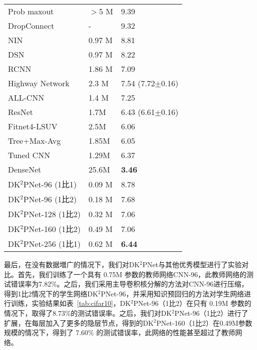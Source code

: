 \begin{table} [!h]
\begin{center}
\begin{tabular}{L{5cm}C{2cm}C{3cm}}
Prob maxout~\cite{springenberg2013improving} & $>$5 M & 9.39 \\
DropConnect~\cite{wan2013regularization} & - & 9.32 \\
NIN~\cite{lin2013network} & 0.97 M & 8.81 \\
DSN~\cite{lee2015deeply} & 0.97 M & 8.22 \\
RCNN~\cite{liang2015recurrent} & 1.86 M & 7.09 \\
Highway Network~\cite{srivastava2015training} & 2.3 M & 7.54 (7.72${\pm}$0.16) \\
ALL-CNN~\cite{springenberg2014striving} & 1.4 M & 7.25 \\
ResNet~\cite{he2015deep} & 1.7M & {6.43 (6.61${\pm}$0.16)} \\
Fitnet4-LSUV~\cite{mishkin2015all} & 2.5M & 6.06 \\
Tree+Max-Avg~\cite{lee2015generalizing} & 1.85M & 6.05 \\
Tuned CNN~\cite{snoek2015scalable} & 1.29M & 6.37 \\
DenseNet~\cite{huang2016densely} & 25.6M & \bf{3.46} \\
\hline
DK$^2$PNet-96 (1比1) & 0.09 M & {8.78} \\
DK$^2$PNet-96 (1比2) & 0.18 M &{7.68} \\
DK$^2$PNet-128 (1比2) & 0.32 M & 7.06 \\
DK$^2$PNet-160 (1比2) & 0.49 M & 7.06 \\
DK$^2$PNet-256 (1比1) & 0.62 M & \bf{6.44} \\
  \bottomrule[1.5pt]
\end{tabular}
\end{center}
\end{table}

最后，在没有数据増广的情况下，我们对DK$^2$PNet与其他优秀模型进行了实验对比。首先，我们训练了一个具有 0.75M 参数的教师网络CNN-96，此教师网络的测试错误率为7.82\%。之后，我们采用主导卷积核分解的方法对CNN-96进行压缩，得到1比2情况下的学生网络DK$^2$PNet-96，并采用知识预回归的方法对学生网络进行训练，实验结果如表~\ref{tab:cifar10}，DK$^2$PNet-96（1比2）在只有 0.19M 参数的情况下，取得了8.73\%的测试错误率。之后，我们对DK$^2$PNet-96（1比2）进行了扩展，在每层加入了更多的隐层节点，得到的DK$^2$PNet-160（1比2）在0.49M参数规模的情况下，得到了 7.60\% 的测试错误率，此网络的性能甚至超过了教师网络。


